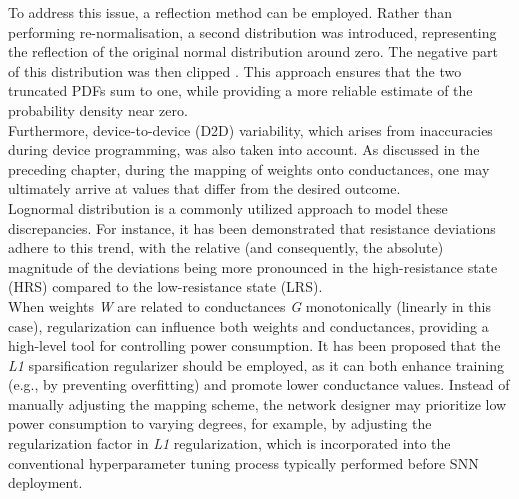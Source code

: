 \noindent To address this issue, a reflection method can be employed. Rather than performing re-normalisation, a second distribution was introduced, representing the reflection of the original normal distribution around zero. The negative part of this distribution was then clipped \cite{jones1993simple}. This approach ensures that the two truncated PDFs sum to one, while providing a more reliable estimate of the probability density near zero.\\

\noindent Furthermore, device-to-device (D2D) variability, which arises from inaccuracies during device programming, was also taken into account. As discussed in the preceding chapter, during the mapping of weights onto conductances, one may ultimately arrive at values that differ from the desired outcome. \\

\noindent Lognormal distribution is a commonly utilized approach to model these discrepancies. For instance, it has been demonstrated that resistance deviations adhere to this trend, with the relative (and consequently, the absolute) magnitude of the deviations being more pronounced in the high-resistance state (HRS) compared to the low-resistance state (LRS).\\

\noindent When weights \textit{W} are related to conductances \textit{G} monotonically (linearly in this case), regularization can influence both weights and conductances, providing a high-level tool for controlling power consumption. It has been proposed that the \textit{L1} sparsification regularizer \cite{han2015learning} should be employed, as it can both enhance training (e.g., by preventing overfitting) and promote lower conductance values. Instead of manually adjusting the mapping scheme, the network designer may prioritize low power consumption to varying degrees, for example, by adjusting the regularization factor in \textit{L1} regularization, which is incorporated into the conventional hyperparameter tuning process \cite{feurer2019hyperparameter} typically performed before SNN deployment.\\

